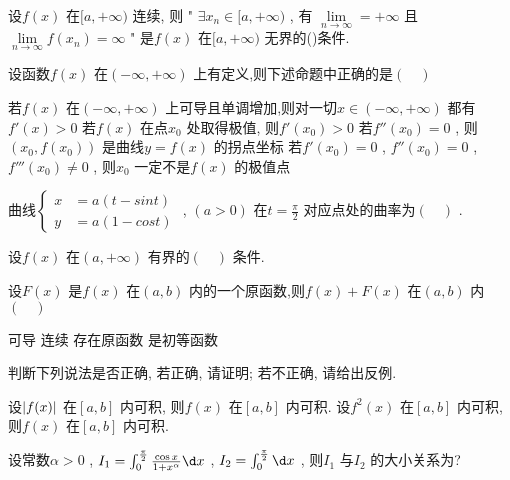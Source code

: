 \begin{question}
    设$ f(x) $ 在$ [a, +\infty) $ 连续, 则 " $ \exists x_n \in[a, +\infty) $ , 有 $ \lim\limits_{n \to \infty} = +\infty $ 且$ \lim\limits_{n \to \infty} f(x_n) = \infty $ " 是$ f(x) $ 在$ [a, +\infty) $ 无界的(\quad)条件.
\end{question}
\begin{question}
    设函数$ f(x) $ 在$ (-\infty, +\infty) $ 上有定义,则下述命题中正确的是$ (\quad) $ 
    \begin{tasks}
        \task   若$ f(x) $ 在$ (-\infty, +\infty) $ 上可导且单调增加,则对一切$ x \in (-\infty, +\infty) $ 都有$ f'(x) > 0 $ 
        \task   若$ f(x) $ 在点$ x_0 $ 处取得极值, 则$ f'(x_0) > 0 $ 
        \task   若$ f''(x_0) = 0 $ , 则$ (x_0, f(x_0)) $ 是曲线$ y = f(x) $ 的拐点坐标
        \task   若$ f'(x_0) = 0 $ , $ f''(x_0) = 0 $ , $ f'''(x_0) \neq 0 $ , 则$ x_0 $ 一定不是$ f(x) $ 的极值点
    \end{tasks}
\end{question}
\begin{question}
    曲线$ 
    \begin{cases}
        x &= a(t - sint)    \\
        y &= a(1 - cost)
    \end{cases}
     $ , $ (a > 0) $ 在$ t = \frac{\pi}{2} $ 对应点处的曲率为$ (\quad) $ .
\end{question}
\begin{question}
    设$ f(x) $ 在$ (a, +\infty) $ 有界的$ (\quad) $ 条件.
\end{question}
\begin{question}
    设$ F(x) $ 是$ f(x) $ 在$ (a, b) $ 内的一个原函数,则$ f(x) + F(x) $ 在$ (a, b) $ 内$ (\quad) $ 
    \begin{tasks}
        \task   可导
        \task   连续
        \task   存在原函数
        \task   是初等函数
    \end{tasks}
\end{question}
\begin{question}
    判断下列说法是否正确, 若正确, 请证明; 若不正确, 请给出反例.
    \begin{tasks}
        \task   设$ \lvert f(x)\rvert $ 在$ [a, b] $ 内可积, 则$ f(x) $ 在$ [a, b] $ 内可积.
        \task   设$ f^2(x) $ 在$ [a, b] $ 内可积, 则$ f(x) $ 在$ [a, b] $ 内可积.
    \end{tasks}
\end{question}
\begin{question}
    设常数$ \alpha > 0 $ , $ I_1 = \int_{0}^{\frac{\pi}{2}} \frac{\cos x}{1 + x^{\alpha}} \d x $ , $ I_2 = \int_{0}^{\frac{\pi}{2}} \d x $ , 则$ I_1 $ 与$ I_2 $ 的大小关系为?
\end{question}
